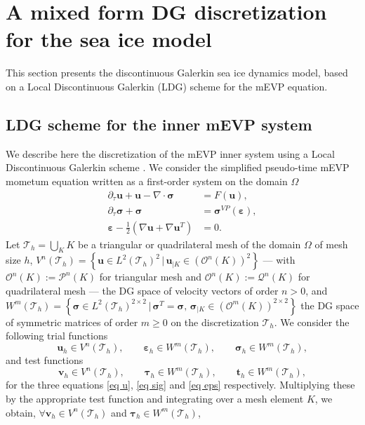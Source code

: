 \documentclass[11pt]{article}
\newcommand{\bu}{\mathbf{u}}
\newcommand{\bv}{\mathbf{v}}
\newcommand{\bt}{\mathbf{t}}
\newcommand{\sig}{\boldsymbol{\sigma}}
\newcommand{\btau}{\boldsymbol{\tau}}
\newcommand{\beps}{\boldsymbol{\varepsilon}}
\begin{document}

\section{A mixed form DG discretization for the sea ice model}
This section presents the discontinuous Galerkin sea ice dynamics model, based on a Local Discontinuous Galerkin (LDG) scheme for the mEVP equation. 
\subsection{LDG scheme for the inner mEVP system}
We describe here the discretization of the mEVP inner system using a Local Discontinuous Galerkin scheme \cite{di2011mathematical, cockburn1998local}. We consider the simplified pseudo-time mEVP mometum equation written as a first-order system on the domain $\Omega$
\begin{align}
 \partial_\tau \mathbf{u} +\bu - \nabla \cdot \boldsymbol{\sigma} &= F(\mathbf{u}), \label{eq u}\\
\partial_\tau \boldsymbol{\sigma} + \boldsymbol{\sigma}
&= \boldsymbol{\sigma}^{VP}(\beps), \label{eq sig} \\
\beps- \frac{1}{2} (\nabla \mathbf{u} + \nabla \mathbf{u} ^T) &=0 \label{eq eps}.
\end{align}
Let $\mathcal{T}_h = \bigcup_K K$ be a triangular or quadrilateral mesh of the domain $\Omega$ of mesh size $h$, 
$V^n(\mathcal{T}_h) = \left \{ \bu \in L^2(\mathcal{T}_h)^2\, | \, \bu_{|K}  \in (\mathcal{O}^n(K))^2 \right \}$ --- with $\mathcal{O}^n(K):=\mathcal{P}^n(K)$ for triangular mesh and $\mathcal{O}^n(K):=\mathcal{Q}^n(K)$ for quadrilateral mesh --- the DG space of velocity vectors of order $n>0$, and $W^m(\mathcal{T}_h) = \left \{ \sig \in L^2(\mathcal{T}_h)^{2\times 2} \, | \, \sig^T = \sig,\,  \sig_{|K}  \in (\mathcal{O}^m(K))^{2\times 2} \right \}$ the DG space of symmetric matrices of order $m\ge0$ on the discretization $\mathcal{T}_h$. We consider the following trial functions 
\[
\bu_h \in V^n(\mathcal{T}_h), \qquad
\beps_h \in W^m(\mathcal{T}_h), \qquad
\sig_h \in W^m(\mathcal{T}_h),
\] 
and test functions
\[
\bv_h \in V^n(\mathcal{T}_h), \qquad
\btau_h \in W^m(\mathcal{T}_h), \qquad
\bt_h \in W^m(\mathcal{T}_h),
\]
for the three equations \eqref{eq u}, \eqref{eq sig} and \eqref{eq eps} respectively. 
Multiplying these by the appropriate test function and integrating over a mesh element $K$, we obtain, $\forall \bv_h \in V^n(\mathcal{T}_h) $ and $\btau_h \in W^m(\mathcal{T}_h)$,
\end{document}

